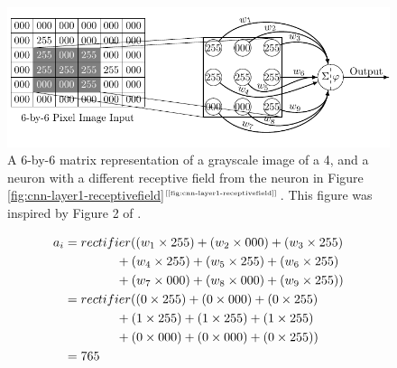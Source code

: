\documentclass[xcolor={table}]{beamer}
\newcommand{\ourRef}[1]{\ref{#1}$^{\text{\tiny[\pageref{#1}]}}$}
\begin{document}
 \begin{frame} 
\begin{figure}[t]
\centerline{
\includegraphics[width=\textwidth]{./images/fmlpda_8_32.pdf}
}
\caption[A 6-by-6 matrix representation of a grayscale image of a 4, and a neuron with a different receptive field from the neuron in Figure \ourRef{fig:cnn-layer1-receptivefield}.]{A 6-by-6 matrix representation of a grayscale image of a 4, and a neuron with a different receptive field from the neuron in Figure \ourRef{fig:cnn-layer1-receptivefield}. This figure was inspired by Figure 2 of \citep{kelleher2017not}.}
\label{fig:cnn-layer1-receptivefield2}
\end{figure}
\end{frame} 



 \begin{frame} 
\begin{alignat}{2}
a_i&= rectifier(\left(w_1 \times 255\right) + \left(w_2 \times 000\right) + \left(w_3 \times 255\right)\notag\\
~&\hspace{1.45cm}+\left(w_4 \times 255\right) + \left(w_5 \times 255\right) + \left(w_6 \times 255\right)\notag\\
~&\hspace{1.45cm}+\left(w_7 \times 000\right) + \left(w_8 \times 000\right) + \left(w_9 \times 255\right) )\notag\\
~&= rectifier(\left(0 \times 255\right) + \left(0 \times 000\right) + \left(0 \times 255\right)\notag\\
~&\hspace{1.45cm}+ \left(1 \times 255\right) + \left(1 \times 255\right) + \left(1 \times 255\right)\notag\\
~&\hspace{1.45cm}+ \left(0 \times 000\right) + \left(0 \times 000\right) + \left(0 \times 255\right) )\notag\\
~&= 765~
\label{eq:activationreceptivefield2}
\end{alignat}
\end{frame} 
\end{document}
